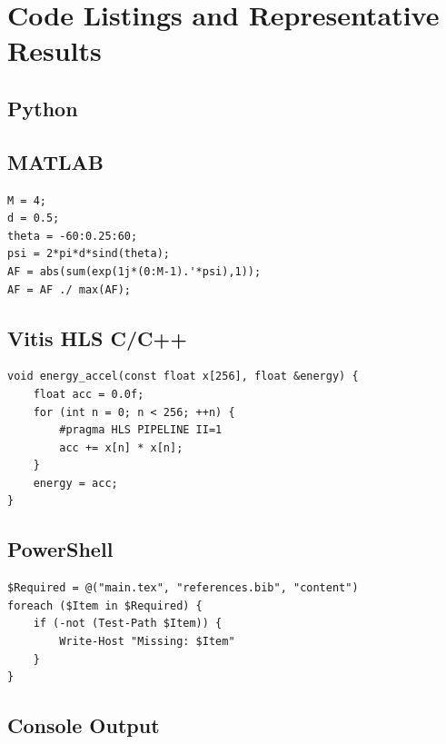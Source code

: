 \section{Code Listings and Representative Results}

\subsection{Python}



\subsection{MATLAB}

\begin{lstlisting}[style=Matlab,caption={Example MATLAB-style array calculation.}]
M = 4;
d = 0.5;
theta = -60:0.25:60;
psi = 2*pi*d*sind(theta);
AF = abs(sum(exp(1j*(0:M-1).'*psi),1));
AF = AF ./ max(AF);
\end{lstlisting}

\subsection{Vitis HLS C/C++}

\begin{lstlisting}[style=vitisHLS,caption={Illustrative HLS accumulation loop.}]
void energy_accel(const float x[256], float &energy) {
    float acc = 0.0f;
    for (int n = 0; n < 256; ++n) {
        #pragma HLS PIPELINE II=1
        acc += x[n] * x[n];
    }
    energy = acc;
}
\end{lstlisting}

\subsection{PowerShell}

\begin{lstlisting}[style=PowerShell,caption={Illustrative report-folder validation.}]
$Required = @("main.tex", "references.bib", "content")
foreach ($Item in $Required) {
    if (-not (Test-Path $Item)) {
        Write-Host "Missing: $Item"
    }
}
\end{lstlisting}

\subsection{Console Output}


